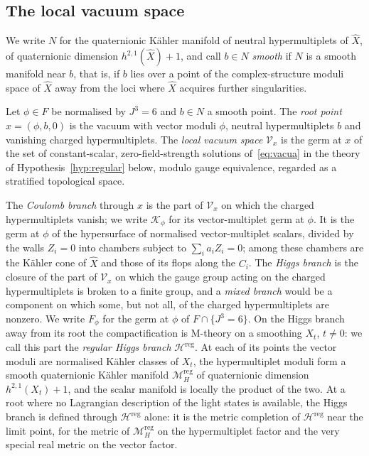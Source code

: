 \subsection{The local vacuum space}
\label{subsec:object}

We write $N$ for the quaternionic K\"ahler manifold of neutral hypermultiplets of $\widehat X$,
of quaternionic dimension $h^{2,1}(\widehat X)+1$, and call $b\in N$ \emph{smooth} if $N$ is a
smooth manifold near $b$, that is, if $b$ lies over a point of the complex-structure moduli space
of $\widehat X$ away from the loci where $\widehat X$ acquires further singularities.

\begin{definition}\label{def:vacuum-germ}
Let $\phi\in F$ be normalised by $J^3=6$ and $b\in N$ a smooth point. The \emph{root point}
$x=(\phi,b,0)$ is the vacuum with vector moduli $\phi$, neutral hypermultiplets $b$ and
vanishing charged hypermultiplets. The \emph{local vacuum space} $\mathcal V_x$ is the germ at
$x$ of the set of constant-scalar, zero-field-strength solutions of~\eqref{eq:vacua} in the
theory of Hypothesis~\ref{hyp:regular} below, modulo gauge equivalence, regarded as a
stratified topological space.
\end{definition}

The \emph{Coulomb branch} through $x$ is the part of $\mathcal V_x$ on which the charged
hypermultiplets vanish; we write $\mathcal K_\phi$ for its vector-multiplet germ at $\phi$. It is
the germ at $\phi$ of the hypersurface of normalised vector-multiplet scalars, divided by the
walls $Z_i=0$ into chambers subject to $\sum_ia_iZ_i=0$; among these chambers are the K\"ahler
cone of $\widehat X$ and those of its flops along the $C_i$. The \emph{Higgs branch} is the closure of
the part of $\mathcal V_x$ on which the gauge group acting on the charged hypermultiplets is
broken to a finite group, and a \emph{mixed branch} would be a component on which some, but not
all, of the charged hypermultiplets are nonzero. We write $F_\phi$ for the germ at $\phi$ of
$F\cap\{J^3=6\}$. On the Higgs branch away from its root the compactification is M-theory on a
smoothing $X_t$, $t\neq0$: we call this part the \emph{regular Higgs branch}
$\mathcal H^{\mathrm{reg}}$. At each of its points the vector moduli are normalised K\"ahler
classes of $X_t$, the hypermultiplet moduli form a smooth quaternionic K\"ahler manifold
$\mathcal M_H^{\mathrm{reg}}$ of quaternionic dimension $h^{2,1}(X_t)+1$, and the scalar manifold
is locally the product of the two. At a root where no Lagrangian description of the light
states is available, the Higgs branch is defined through $\mathcal H^{\mathrm{reg}}$ alone: it is
the metric completion of $\mathcal H^{\mathrm{reg}}$ near the limit point, for the metric of
$\mathcal M_H^{\mathrm{reg}}$ on the hypermultiplet factor and the very special real metric on
the vector factor.


